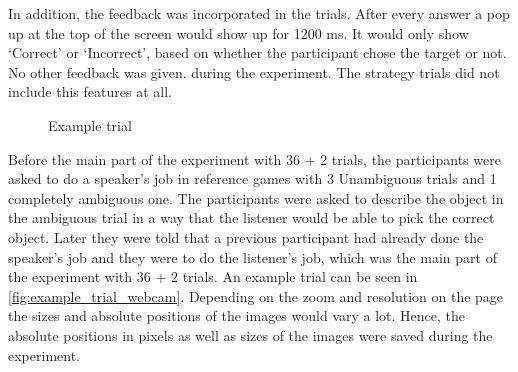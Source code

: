 In addition, the feedback was incorporated in the trials. After every answer a pop up at the top of the screen would show up for 1200 ms. It would only show `Correct' or `Incorrect', based on whether the participant chose the target or not. No other feedback was given. during the experiment. The strategy trials did not include this features at all. 

\begin{figure}
    \centering
    \caption{Example trial}
    \label{fig:example_trial_webcam}
\end{figure}

Before the main part of the experiment with 36 + 2 trials, the participants were asked to do a speaker's job in reference games with 3 Unambiguous trials and 1 completely ambiguous one. The participants were asked to describe the object in the ambiguous trial in a way that the listener would be able to pick the correct object. Later they were told that a previous participant had already done the speaker's job and they were to do the listener's job, which was the main part of the experiment with 36 + 2 trials. An example trial can be seen in \autoref{fig:example_trial_webcam}. Depending on the zoom and resolution on the page the sizes and absolute positions of the images would vary a lot. Hence, the absolute positions in pixels as well as sizes of the images were saved during the experiment. 


